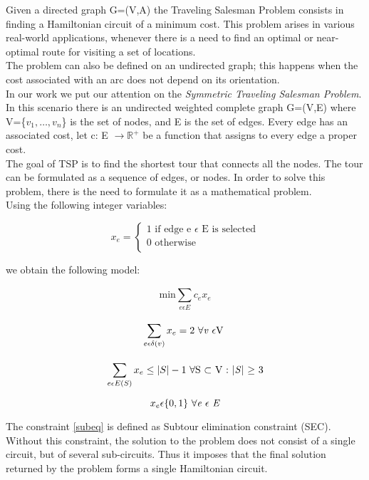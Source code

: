 Given a directed graph G=(V,A) the Traveling Salesman Problem consists in finding a Hamiltonian circuit of a minimum cost. This problem arises in various real-world applications, whenever there is a need to find an optimal or near-optimal route for visiting a set of locations.\\
The problem can also be defined on an undirected graph; this happens when the cost associated with an arc does not depend on its orientation.\\ 
In our work we put our attention on the \textit{Symmetric Traveling Salesman Problem}. In this scenario there is an undirected weighted complete graph G=(V,E) where V=\{$v_1,\dotsc,v_n$\} is the set of nodes, and E is the set of edges. Every edge has an associated cost, let c: E $\rightarrow \mathbb{R}^+$ be a function that assigns to every edge a proper cost.\\
The goal of TSP is to find the shortest tour that connects all the nodes. The tour can be formulated as a sequence of edges, or nodes. In order to solve this problem, there is the need to formulate it as a mathematical problem.
\\Using the following integer variables:



\begin{equation*}
    x_e=
        \begin{cases}
            \text{1 if edge e $\epsilon$ E is selected}\\
        0 \text{ otherwise}\\
          \end{cases}
\end{equation*}

we obtain the following model:

\begin{equation}
    \text{min}\sum_{e \epsilon E}^{}c_ex_e
\end{equation}

\begin{equation}
    \sum_{e \epsilon \delta (v)}^{}x_e=2 \text{ $\forall$\textit{v} $\epsilon$V } 
\end{equation}

\begin{equation} \label{subeq}
    \sum_{e\epsilon E(S)}^{}x_e \leq |S|-1 \text{ $\forall$S $\subset$ V : |\textit{S}| $\geq$ 3}
\end{equation}

\begin{equation}
    x_e \epsilon \{0,1\} \text{ $\forall$\textit{e} $\epsilon$ \textit{E}}
\end{equation}


The constraint \ref{subeq} is defined as Subtour elimination constraint (SEC). Without this constraint, the solution to the problem does not consist of a single circuit, but of several sub-circuits. Thus it imposes that the final solution returned by the problem forms a single Hamiltonian circuit.